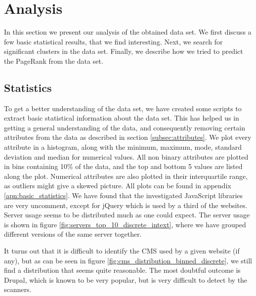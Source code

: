 \section{Analysis}
\label{sec:analysis}

In this section we present our analysis of the obtained data set. We first discuss a few basic statistical results, that we find interesting. Next, we search for significant clusters in the data set. Finally, we describe how we tried to predict the {PageRank} from the data set.

\subsection{Statistics}
\label{subsec:statistics}

To get a better understanding of the data set, we have created some scripts to extract basic statistical information about the data set. This has helped us in getting a general understanding of the data, and consequently removing certain attributes from the data as described in section \ref{subsec:attributes}. We plot every attribute in a histogram, along with the minimum, maximum, mode, standard deviation and median for numerical values. All non binary attributes are plotted in bins containing 10\% of the data, and the top and bottom 5 values are listed along the plot. Numerical attributes are also plotted in their interquartile range, as outliers might give a skewed picture. All plots can be found in appendix \ref{apn:basic_statistics}. We have found that the investigated JavaScript libraries are very uncomment, except for {jQuery} which is used by a third of the websites. Server usage seems to be distributed much as one could expect. The server usage is shown in figure \ref{fig:servers_top_10_discrete_intext}, where we have grouped different versions of the same server together.


It turns out that it is difficult to identify the {CMS} used by a given website (if any), but as can be seen in figure \ref{fig:cms_distribution_binned_discrete}, we still find a distribution that seems quite reasonable. The most doubtful outcome is Drupal, which is known to be very popular, but is very difficult to detect by the scanners.


